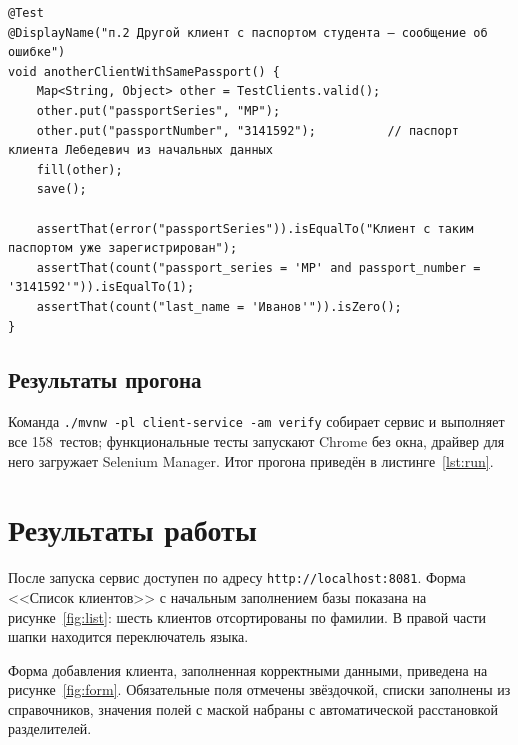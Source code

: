 \documentclass[14pt,a4paper]{extarticle}
\begin{document}
\begin{lstlisting}[style=java, caption={Функциональный тест пункта 2 через WebDriver (\texttt{ClientUiIT})}, label={lst:ui}]
@Test
@DisplayName("п.2 Другой клиент с паспортом студента — сообщение об ошибке")
void anotherClientWithSamePassport() {
    Map<String, Object> other = TestClients.valid();
    other.put("passportSeries", "MP");
    other.put("passportNumber", "3141592");          // паспорт клиента Лебедевич из начальных данных
    fill(other);
    save();

    assertThat(error("passportSeries")).isEqualTo("Клиент с таким паспортом уже зарегистрирован");
    assertThat(count("passport_series = 'MP' and passport_number = '3141592'")).isEqualTo(1);
    assertThat(count("last_name = 'Иванов'")).isZero();
}
\end{lstlisting}

\subsection{Результаты прогона}

Команда \texttt{./mvnw -pl client-service -am verify} собирает сервис и выполняет все
158~тестов; функциональные тесты запускают Chrome без окна, драйвер для него загружает
Selenium Manager. Итог прогона приведён в листинге~\ref{lst:run}.


\section{Результаты работы}

После запуска сервис доступен по адресу \texttt{http://localhost:8081}. Форма <<Список
клиентов>> с начальным заполнением базы показана на рисунке~\ref{fig:list}: шесть клиентов
отсортированы по фамилии. В правой части шапки находится переключатель языка.


Форма добавления клиента, заполненная корректными данными, приведена на
рисунке~\ref{fig:form}. Обязательные поля отмечены звёздочкой, списки заполнены из
справочников, значения полей с маской набраны с автоматической расстановкой разделителей.

\end{document}
